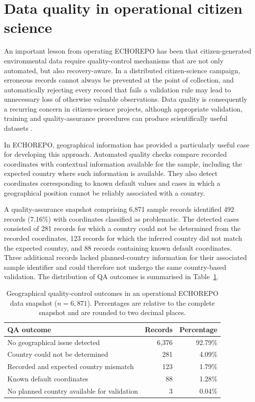 \section{Data quality in operational citizen science}
\label{sec:data-quality}

An important lesson from operating ECHOREPO has been that citizen-generated environmental data require quality-control mechanisms that are not only automated, but also recovery-aware. In a distributed citizen-science campaign, erroneous records cannot always be prevented at the point of collection, and automatically rejecting every record that fails a validation rule may lead to unnecessary loss of otherwise valuable observations.
Data quality is consequently a recurring concern in citizen-science
projects, although appropriate validation, training and quality-assurance
procedures can produce scientifically useful datasets
\parencite{kosmala2016quality}.

In ECHOREPO, geographical information has provided a particularly useful case for developing this approach. Automated quality checks compare recorded coordinates with contextual information available for the sample, including the expected country where such information is available. They also detect coordinates corresponding to known default values and cases in which a geographical position cannot be reliably associated with a country.

A quality-assurance snapshot comprising 6,871 sample records identified 492 records (7.16\%) with coordinates classified as problematic. The detected cases consisted of 281 records for which a country could not be determined from the recorded coordinates, 123 records for which the inferred country did not match the expected country, and 88 records containing known default coordinates. Three additional records lacked planned-country information for their associated sample identifier and could therefore not undergo the same country-based validation. The distribution of QA outcomes is summarised in Table~\ref{tab:coordinate-qa}.

\begin{table}[htbp]
    \centering
    \caption{Geographical quality-control outcomes in an operational ECHOREPO data snapshot ($n=6{,}871$). Percentages are relative to the complete snapshot and are rounded to two decimal places.}
    \label{tab:coordinate-qa}
    \begin{tabular}{lrr}
        \toprule
        QA outcome & Records & Percentage \\
        \midrule
        No geographical issue detected & 6,376 & 92.79\% \\
        Country could not be determined & 281 & 4.09\% \\
        Recorded and expected country mismatch & 123 & 1.79\% \\
        Known default coordinates & 88 & 1.28\% \\
        No planned country available for validation & 3 & 0.04\% \\
        \bottomrule
    \end{tabular}
\end{table}

